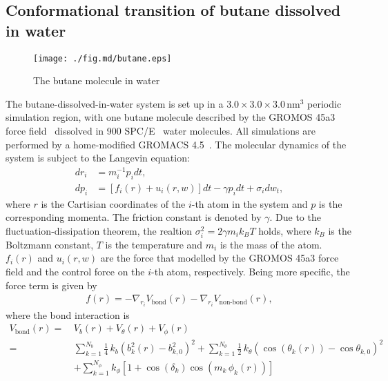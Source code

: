 \documentclass[final]{siamltex}
\begin{document}
\subsection{Conformational transition of butane dissolved in water}

\begin{figure}
  \centering
  \texttt{[image: ./fig.md/butane.eps]}
  \caption{The butane molecule in water}
  \label{fig:tmp1}
\end{figure}

The butane-dissolved-in-water system is set up in a $3.0\times
3.0\times 3.0\, \textrm{nm}^3$ periodic simulation region, with one
butane molecule described by the GROMOS 45a3 force
field~\cite{schuler2001improved} dissolved in 900
SPC/E~\cite{berendsen1987missing} water molecules.
All simulations are performed by a home-modified GROMACS
4.5~\cite{pronk2013gromacs}.  The molecular dynamics of the system is
subject to the Langevin equation:
\begin{align}\label{eqn:langevin-r}
  dr_i &= m_i^{-1}p_idt, \\\label{eqn:langevin-p}
  dp_i &= [ f_i(r)  + u_i (r, w) ] dt - \gamma p_i dt + \sigma_i dw_t,
\end{align}
where $r$ is the Cartisian coordinates of the $i$-th atom in the
system and $p$ is the corresponding momenta. The friction
constant is denoted by $\gamma$. Due to the
fluctuation-dissipation theorem, the realtion $\sigma_i^2 = 2\gamma
m_i k_B T$ holds, where $k_B$ is the Boltzmann constant, $T$ is the
temperature and $m_i$ is the mass of the atom.  $f_i(r)$ and $u_i(r, w)$
are the force that modelled by the GROMOS 45a3 force field and the
control force on the $i$-th atom, respectively. Being more specific,
the force term is given by
\begin{align}\label{eqn:gromos-inter}
  f(r) = -\nabla_{r_i} V_{\textrm{bond}}(r) - \nabla_{r_i} V_{\textrm{non-bond}}(r),
\end{align}
where the bond interaction is
\begin{align}\nonumber
  V_{\textrm{bond}}(r) =\,&
  V_b(r) + V_\theta(r) + V_\phi(r) \\\nonumber
  =\,&
  \sum_{k = 1}^{N_b} \frac14\, k_b(b_k^2(r) - b_{k,0}^2)^2 
  + 
  \sum_{k = 1}^{N_\theta}\frac12\, k_\theta(\cos(\theta_k(r)) - \cos\theta_{k,0})^2\\\label{eqn:gromos-bd}
  &+
  \sum_{k = 1}^{N_\phi} k_\phi [ 1 + \cos (\delta_k) \cos (m_k\,\phi_k(r))]
\end{align}
\end{document}
